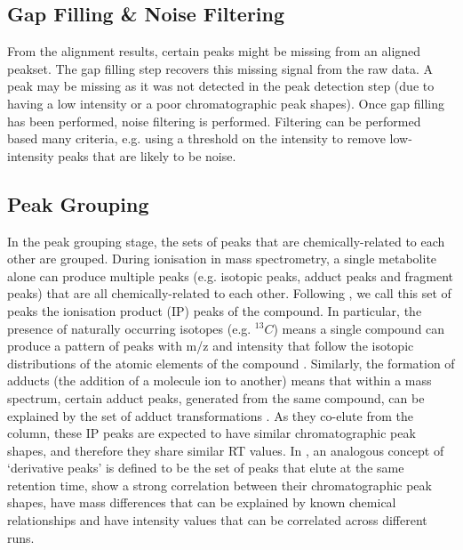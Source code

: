 
\subsection{Gap Filling \& Noise Filtering}

From the alignment results, certain peaks might be missing from an aligned peakset. The gap filling step recovers this missing signal from the raw data. A peak may be missing as it was not detected in the peak detection step (due to having a low intensity or a poor chromatographic peak shapes). Once gap filling has been performed, noise filtering is performed. Filtering can be performed based many criteria, e.g. using a threshold on the intensity to remove low-intensity peaks that are likely to be noise. 

\subsection{Peak Grouping\label{sub:grouping-background}}

In the peak grouping stage, the sets of peaks that are chemically-related to each other are grouped. During ionisation in mass spectrometry, a single metabolite alone can produce multiple peaks (e.g. isotopic peaks, adduct peaks and fragment peaks) that are all chemically-related to each other. Following \cite{Lee2013}, we call this set of peaks the ionisation product (IP) peaks of the compound. In particular, the presence of naturally occurring isotopes (e.g. $^{13}C$) means a single compound can produce a pattern of peaks with m/z and intensity that follow the isotopic distributions of the atomic elements of the compound \cite{Snider2007}. Similarly, the formation of adducts (the addition of a molecule ion to another) means that within a mass spectrum, certain adduct peaks, generated from the same compound, can be explained by the set of adduct transformations \cite{Keller2008}. As they co-elute from the column, these IP peaks are expected to have similar chromatographic peak shapes, and therefore they share similar RT values. In \cite{Scheltema2009a}, an analogous concept of `derivative peaks' is defined to be the set of peaks that elute at the same retention time, show a strong correlation between their chromatographic peak shapes, have mass differences that can be explained by known chemical relationships and have intensity values that can be correlated across different runs. 

